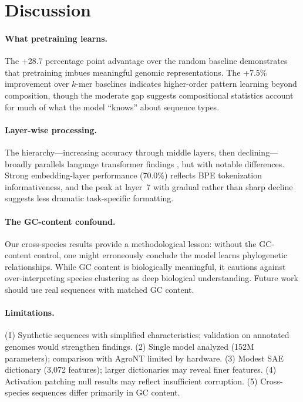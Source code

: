 \documentclass[12pt]{article}
\begin{document}
\section{Discussion}

\paragraph{What pretraining learns.}
The +28.7 percentage point advantage over the random baseline demonstrates that pretraining imbues meaningful genomic representations. The +7.5\% improvement over $k$-mer baselines indicates higher-order pattern learning beyond composition, though the moderate gap suggests compositional statistics account for much of what the model ``knows'' about sequence types.

\paragraph{Layer-wise processing.}
The hierarchy---increasing accuracy through middle layers, then declining---broadly parallels language transformer findings \citep{tenney2019bert, rogers2020primer}, but with notable differences. Strong embedding-layer performance (70.0\%) reflects BPE tokenization informativeness, and the peak at layer~7 with gradual rather than sharp decline suggests less dramatic task-specific formatting.

\paragraph{The GC-content confound.}
Our cross-species results provide a methodological lesson: without the GC-content control, one might erroneously conclude the model learns phylogenetic relationships. While GC content is biologically meaningful, it cautions against over-interpreting species clustering as deep biological understanding. Future work should use real sequences with matched GC content.

\paragraph{Limitations.}
(1) Synthetic sequences with simplified characteristics; validation on annotated genomes would strengthen findings. (2) Single model analyzed (152M parameters); comparison with AgroNT limited by hardware. (3) Modest SAE dictionary (3,072 features); larger dictionaries may reveal finer features. (4) Activation patching null results may reflect insufficient corruption. (5) Cross-species sequences differ primarily in GC content.
\end{document}
